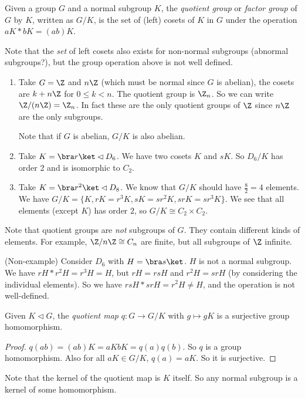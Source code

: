 \documentclass[a4paper]{article}
\begin{document}
\begin{defi}
  Given a group $G$ and a normal subgroup $K$, the \emph{quotient group} or \emph{factor group} of $G$ by $K$, written as $G/K$, is the set of (left) cosets of $K$ in $G$ under the operation $aK*bK = (ab)K$.
\end{defi}
Note that the \emph{set} of left cosets also exists for non-normal subgroups (abnormal subgroups?), but the group operation above is not well defined.

\begin{eg}\leavevmode
  \begin{enumerate}
    \item Take $G = \Z$ and $n\Z$ (which must be normal since $G$ is abelian), the cosets are $k + n\Z$ for $0 \leq k < n$. The quotient group is $\Z_n$. So we can write $\Z/(n\Z) = \Z_n$. In fact these are the only quotient groups of $\Z$ since $n\Z$ are the only subgroups.

      Note that if $G$ is abelian, $G/K$ is also abelian.
    \item Take $K = \bra r\ket \lhd D_6$. We have two cosets $K$ and $sK$. So $D_6/K$ has order 2 and is isomorphic to $C_2$.
    \item Take $K = \bra r^2\ket \lhd D_8$. We know that $G/K$ should have $\frac{8}{2} = 4$ elements. We have $G/K = \{ K, rK = r^3 K, sK = sr^2K, srK = sr^3K\}$. We see that all elements (except $K$) has order $2$, so $G/K\cong C_2\times C_2$.
  \end{enumerate}
\end{eg}
Note that quotient groups are \emph{not} subgroups of $G$. They contain different kinds of elements. For example, $\Z/n\Z \cong C_n$ are finite, but all subgroups of $\Z$ infinite.


\begin{eg}
  (Non-example) Consider $D_6$ with $H = \bra s\ket$. $H$ is not a normal subgroup. We have $rH * r^2 H = r^3 H = H$, but $rH = rsH$ and $r^2H = srH$ (by considering the individual elements). So we have $rsH * srH = r^2 H\not= H$, and the operation is not well-defined.
\end{eg}

\begin{lemma}
  Given $K\lhd G$, the \emph{quotient map} $q: G\rightarrow G/K$ with $g\mapsto gK$ is a surjective group homomorphism.
\end{lemma}

\begin{proof}
  $q(ab) = (ab)K = aKbK = q(a)q(b)$. So $q$ is a group homomorphism. Also for all $aK \in G/K$, $q(a) = aK$. So it is surjective.
\end{proof}
Note that the kernel of the quotient map is $K$ itself. So any normal subgroup is a kernel of some homomorphism.
\end{document}
